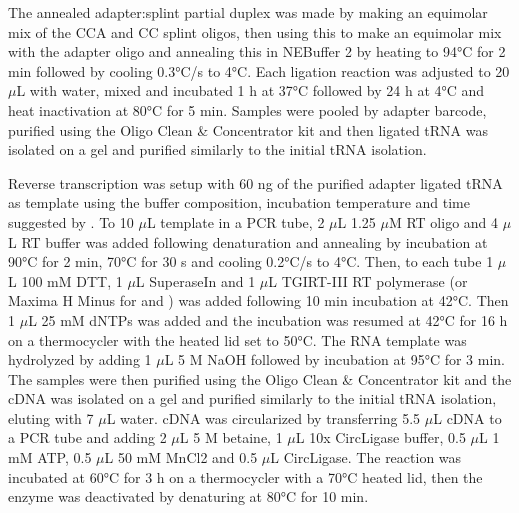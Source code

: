 \documentclass[9pt,lineno]{elife}
\begin{document}
The annealed adapter:splint partial duplex was made by making an equimolar mix of the CCA and CC splint oligos, then using this to make an equimolar mix with the adapter oligo and annealing this in NEBuffer 2 by heating to 94°C for 2 min followed by cooling 0.3°C/s to 4°C.
Each ligation reaction was adjusted to 20 $\mu$L with water, mixed and incubated 1 h at 37°C followed by 24 h at 4°C and heat inactivation at 80°C for 5 min.
Samples were pooled by adapter barcode, purified using the Oligo Clean \& Concentrator kit and then ligated tRNA was isolated on a gel and purified similarly to the initial tRNA isolation.

Reverse transcription was setup with 60 ng of the purified adapter ligated tRNA as template using the buffer composition, incubation temperature and time suggested by \cite{Behrens2021-gb}.
To 10 $\mu$L template in a PCR tube, 2 $\mu$L 1.25 $\mu$M RT oligo and 4 $\mu$L RT buffer was added following denaturation and annealing by incubation at 90°C for 2 min, 70°C for 30 s and cooling 0.2°C/s to 4°C.
Then, to each tube 1 $\mu$L 100 mM DTT, 1 $\mu$L SuperaseIn and 1 $\mu$L TGIRT-III RT polymerase (or Maxima H Minus for  and ) was added following 10 min incubation at 42°C.
Then 1 $\mu$L 25 mM dNTPs was added and the incubation was resumed at 42°C for 16 h on a thermocycler with the heated lid set to 50°C.
The RNA template was hydrolyzed by adding 1 $\mu$L 5 M NaOH followed by incubation at 95°C for 3 min.
The samples were then purified using the Oligo Clean \& Concentrator kit and the cDNA was isolated on a gel and purified similarly to the initial tRNA isolation, eluting with 7 $\mu$L water.
cDNA was circularized by transferring 5.5 $\mu$L cDNA to a PCR tube and adding 2 $\mu$L 5 M betaine, 1 $\mu$L 10x CircLigase buffer, 0.5 $\mu$L 1 mM ATP, 0.5 $\mu$L 50 mM MnCl2 and 0.5 $\mu$L CircLigase.
The reaction was incubated at 60°C for 3 h on a thermocycler with a 70°C heated lid, then the enzyme was deactivated by denaturing at 80°C for 10 min.
\end{document}
